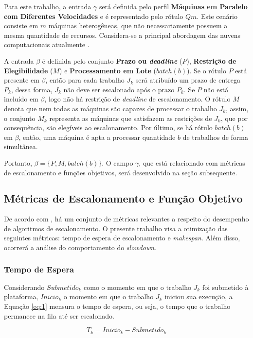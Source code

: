 Para este trabalho, a entrada $\gamma$ será definida pelo perfil \textbf{Máquinas em Paralelo com Diferentes Velocidades} e é representado pelo rótulo $Qm$. Este cenário consiste em $m$ máquinas heterogêneas, que não necessariamente possuem a mesma quantidade de recursos. Considera-se a principal abordagem das nuvens computacionais atualmente \cite{krauter2002taxonomy}.

A entrada $\beta$ é definida pelo conjunto \textbf{Prazo ou \textit{deadline}} ($P$), \textbf{Restrição de Elegibilidade} ($M$) e \textbf{Processamento em Lote} ($batch(b)$). Se o rótulo $P$ está presente em $\beta$, então para cada trabalho $J_{k}$ será atribuído um prazo de entrega $P_{k}$, dessa forma, $J_k$ não deve ser escalonado após o prazo $P_{k}$. Se $P$ não está incluído em $\beta$, logo não há restrição de \textit{deadline} de escalonamento. O rótulo $M$ denota que nem todas as máquinas são capazes de processar o trabalho $J_{k}$, assim, o conjunto $M_{k}$ representa as máquinas que satisfazem as restrições de $J_{k}$, que por consequência, são elegíveis ao escalonamento. Por último, se há rótulo $batch(b)$ em $\beta$, então, uma máquina é apta a processar quantidade $b$ de trabalhos de forma simultânea.

Portanto, $\beta=\{P, M, batch(b)\}$. O campo $\gamma$, que está relacionado com métricas de escalonamento e funções objetivos, será desenvolvido na seção subsequente.

\subsection{Métricas de Escalonamento e Função Objetivo}
De acordo com \cite{Feitelson98}, há um conjunto de métricas relevantes a respeito do desempenho de algoritmos de escalonamento. O presente trabalho visa a otimização das seguintes métricas: tempo de espera de escalonamento e \textit{makespan}. Além disso, ocorrerá a análise do comportamento do \textit{slowdown}.

\subsubsection{Tempo de Espera}
Considerando $Submetido_k$ como o momento em que o trabalho $J_k$ foi submetido à plataforma, $Inicio_k$ o momento em que o trabalho $J_k$ iniciou sua execução, a Equação \ref{eq:1} mensura o tempo de espera, ou seja, o tempo que o trabalho permanece na fila até ser escalonado.

\begin{equation} \label{eq:1}
T_k = Inicio_k - Submetido_k
\end{equation}

